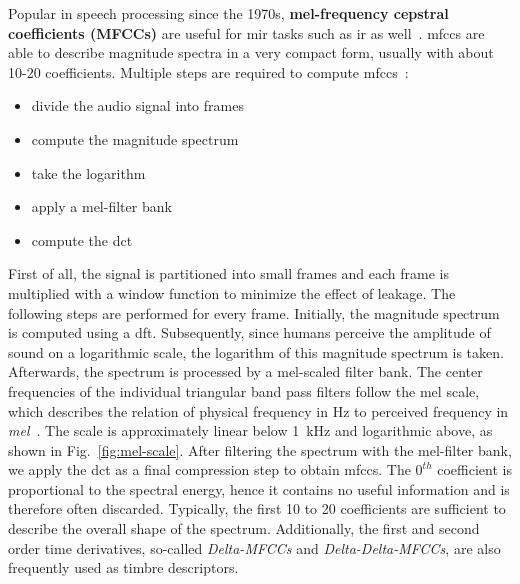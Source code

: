 Popular in speech processing since the 1970s, \textbf{mel-frequency cepstral coefficients (MFCCs)} are useful for \gls{mir} tasks such as \gls{ir} as well~\cite{david2004efficient}. \Glspl{mfcc} are able to describe magnitude spectra in a very compact form, usually with about 10-20 coefficients. Multiple steps are required to compute \glspl{mfcc}~\cite{logan2000mfcc}: 
\begin{itemize}
	\item divide the audio signal into frames
	\item compute the magnitude spectrum
	\item take the logarithm
	\item apply a mel-filter bank
	\item compute the \gls{dct}
\end{itemize}
First of all, the signal is partitioned into small frames and each frame is multiplied with a window function to minimize the effect of leakage. The following steps are performed for every frame. Initially, the magnitude spectrum is computed using a \gls{dft}. Subsequently, since humans perceive the amplitude of sound on a logarithmic scale, the logarithm of this magnitude spectrum is taken. Afterwards, the spectrum is processed by a mel-scaled filter bank. The center frequencies of the individual triangular band pass filters follow the mel scale, which describes the relation of physical frequency in Hz to perceived frequency in \textit{mel}~\cite{stevens1937melscale}. The scale is approximately linear below \SI{1}{\kilo\hertz} and logarithmic above, as shown in Fig.~\ref{fig:mel-scale}. After filtering the spectrum with the mel-filter bank, we apply the \gls{dct} as a final compression step to obtain \glspl{mfcc}. The $0^{th}$ coefficient is proportional to the spectral energy, hence it contains no useful information and is therefore often discarded. Typically, the first 10 to 20 coefficients are sufficient to describe the overall shape of the spectrum. Additionally, the first and second order time derivatives, so-called \textit{Delta-MFCCs} and \textit{Delta-Delta-MFCCs}, are also frequently used as timbre descriptors.

